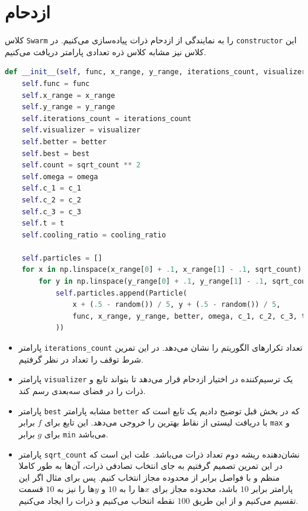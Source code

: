 \documentclass[a4paper, 12pt]{article}
\begin{document}
\section{ازدحام}
کلاس
\texttt{Swarm}
را به نمایندگی از ازدحام ذرات پیاده‌سازی می‌کنیم. در
\texttt{constructor}
این کلاس نیز مشابه کلاس ذره تعدادی پارامتر دریافت می‌کنیم.
\LTR
\begin{lstlisting}[language=Python]
def __init__(self, func, x_range, y_range, iterations_count, visualizer, better, best, sqrt_count, omega, c_1, c_2, c_3, t, cooling_ratio):
    self.func = func
    self.x_range = x_range
    self.y_range = y_range
    self.iterations_count = iterations_count
    self.visualizer = visualizer
    self.better = better
    self.best = best
    self.count = sqrt_count ** 2
    self.omega = omega
    self.c_1 = c_1
    self.c_2 = c_2
    self.c_3 = c_3
    self.t = t
    self.cooling_ratio = cooling_ratio

    self.particles = []
    for x in np.linspace(x_range[0] + .1, x_range[1] - .1, sqrt_count):
        for y in np.linspace(y_range[0] + .1, y_range[1] - .1, sqrt_count):
            self.particles.append(Particle(
                x + (.5 - random()) / 5, y + (.5 - random()) / 5,
                func, x_range, y_range, better, omega, c_1, c_2, c_3, t, cooling_ratio
            ))
\end{lstlisting}
\RTL

\begin{itemize}
    \item پارامتر
          \texttt{iterations\_count}
          تعداد تکرارهای الگوریتم را نشان می‌دهد. در این تمرین شرط توقف را تعداد در نظر گرفتیم.
    \item پارامتر
          \texttt{visualizer}
          یک ترسیم‌کننده در اختیار ازدحام قرار می‌دهد تا بتواند تابع و ذرات را در فضای سه‌بعدی رسم کند.
    \item پارامتر
          \texttt{best}
          مشابه پارامتر
          \texttt{better}
          که در بخش قبل توضیح دادیم یک تابع است که با دریافت لیستی از نقاط بهترین را خروجی می‌دهد. این تابع برای
          $f$
          برابر
          \texttt{max}
          و برای
          $g$
          برابر
          \texttt{min}
          می‌باشد.
    \item پارامتر
          \texttt{sqrt\_count}
          نشان‌دهنده ریشه دوم تعداد ذرات می‌باشد. علت این است که در این تمرین تصمیم گرفتیم به جای انتخاب تصادفی ذرات، آن‌ها به طور کاملا منظم و با فواصل برابر از محدوده مجاز انتخاب کنیم. پس برای مثال اگر این پارامتر برابر
          $10$
          باشد، محدوده مجاز برای
          $x$ها
          را به
          $10$
          و
          $y$ها
          را نیز به
          $10$
          قسمت تقسیم می‌کنیم و از این طریق
          $100$
          نقطه انتخاب می‌کنیم و ذرات را ایجاد می‌کنیم.
\end{itemize}
\end{document}
